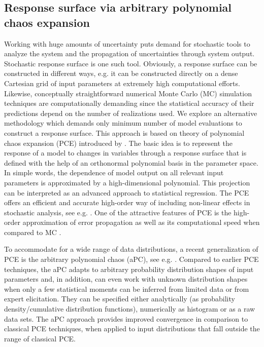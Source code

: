 \subsection{Response surface via arbitrary polynomial chaos expansion}

Working with huge amounts of uncertainty puts demand for stochastic tools to analyze the system and the propagation of uncertainties through system output. Stochastic response surface is one such tool. Obviously, a response surface can be constructed in different ways, e.g. it can be constructed directly on a dense Cartesian grid of input parameters at extremely high computational efforts. Likewise, conceptually straightforward numerical Monte Carlo (MC) simulation techniques are computationally demanding since the statistical accuracy of their predictions depend on the number of realizations used. We explore an alternative methodology which demands only minimum number of model evaluations to construct a response surface. This approach is based on theory of polynomial chaos expansion (PCE) introduced by \cite{Wiener1938}. The basic idea is to represent the response of a model to changes in variables through a response surface that is defined with the help of an orthonormal polynomial basis in the parameter space.  In simple words, the dependence of model output on all relevant input parameters is approximated by a high-dimensional polynomial.  This projection can be interpreted as an advanced approach to statistical regression.  The PCE offers an efficient and accurate high-order way of including non-linear effects in stochastic analysis, see e.g. \cite{Zhang_Lu_2004_JCP,foo_pcm_JCP2010, Fajraoui_al_2011_WRR}. One of the attractive features of PCE is the high-order approximation of error propagation \cite{Ghanem_Spanos_1990_PC_in_SFEM,Ghanem_Spanos_1991_SFEM_book} as well as its computational speed when compared to MC \cite{oladyshkinintegrative}. 

To accommodate for a wide range of data distributions, a recent generalization of PCE is the arbitrary polynomial chaos (aPC), see e.g. \cite{oladyshkin2011concept}. Compared to earlier PCE techniques, the aPC adapts to arbitrary probability distribution shapes of input parameters and, in addition, can even work with unknown distribution shapes when only a few statistical moments can be inferred from limited data or from expert elicitation. They can be specified either analytically (as probability density/cumulative distribution functions), numerically as histogram or as a raw data sets. The aPC approach provides improved convergence in comparison to classical PCE techniques, when applied to input distributions that fall outside the range of classical PCE. 


